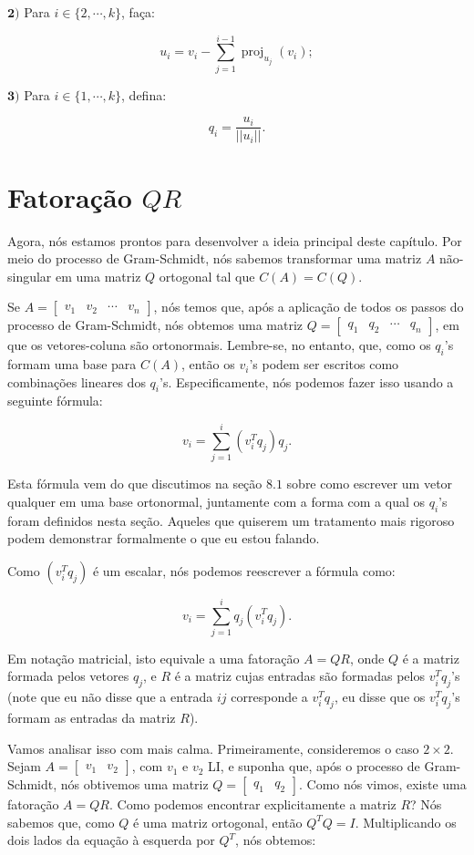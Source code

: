 $\mathbf{2)}$ Para $i\in\{2, \cdots, k\}$, faça:

$$
u_i = v_i - \sum\limits_{j = 1}^{i - 1}\operatorname{proj}_{u_j}(v_i);
$$

$\mathbf{3)}$ Para $i\in\{1, \cdots, k\}$, defina:

$$
q_i = \dfrac{u_i}{||u_i||}.
$$

\section{Fatoração \texorpdfstring{$QR$}{QR}}

Agora, nós estamos prontos para desenvolver a ideia principal deste capítulo. Por meio do processo de Gram-Schmidt, nós sabemos transformar uma matriz $A$ não-singular em uma matriz $Q$ ortogonal tal que $C(A) = C(Q)$.

Se $A = \begin{bmatrix}
	v_1 & v_2 & \cdots & v_n
\end{bmatrix}$, nós temos que, após a aplicação de todos os passos do processo de Gram-Schmidt, nós obtemos uma matriz $Q = \begin{bmatrix}
	q_1 & q_2 & \cdots & q_n
\end{bmatrix}$, em que os vetores-coluna são ortonormais. Lembre-se, no entanto, que, como os $q_i$'s formam uma base para $C(A)$, então os $v_i$'s podem ser escritos como combinações lineares dos $q_i$'s. Especificamente, nós podemos fazer isso usando a seguinte fórmula:

$$
v_i = \sum\limits_{j = 1}^{i} (v_i^Tq_j)q_j.
$$

Esta fórmula vem do que discutimos na seção $8.1$ sobre como escrever um vetor qualquer em uma base ortonormal, juntamente com a forma com a qual os $q_i$'s foram definidos nesta seção. Aqueles que quiserem um tratamento mais rigoroso podem demonstrar formalmente o que eu estou falando.

Como $(v_i^Tq_j)$ é um escalar, nós podemos reescrever a fórmula como:

$$
v_i = \sum\limits_{j = 1}^{i} q_j(v_i^Tq_j).
$$

Em notação matricial, isto equivale a uma fatoração $A = QR$, onde $Q$ é a matriz formada pelos vetores $q_j$, e $R$ é a matriz cujas entradas são formadas pelos $v_i^Tq_j$'s (note que eu não disse que a entrada $ij$ corresponde a $v_i^Tq_j$, eu disse que os $v_i^Tq_j$'s formam as entradas da matriz $R$).

Vamos analisar isso com mais calma. Primeiramente, consideremos o caso $2\times 2$. Sejam $A = \begin{bmatrix}
	v_1 & v_2
\end{bmatrix}$, com $v_1$ e $v_2$ LI, e suponha que, após o processo de Gram-Schmidt, nós obtivemos uma matriz $Q = \begin{bmatrix}
	q_1 & q_2
\end{bmatrix}$. Como nós vimos, existe uma fatoração $A = QR$. Como podemos encontrar explicitamente a matriz $R$? Nós sabemos que, como $Q$ é uma matriz ortogonal, então $Q^TQ = I$. Multiplicando os dois lados da equação à esquerda por $Q^T$, nós obtemos:

